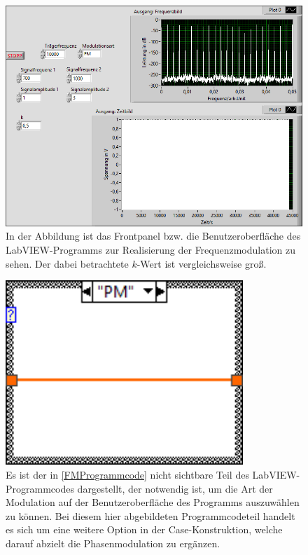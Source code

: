 \documentclass[
a4paper,
12pt,
pagesize,
ngerman
]{scrartcl}
\begin{document}
	\noindent 
	
	\begin{figure}[H]
		\centering
		\includegraphics[width=1.0\textwidth]{EIRE2018Dateien/Tag4/FMPM-Erzeugung/anderekbei10000Traegerfr/FM-FMPM-Erzeugungp}
		\caption{In der Abbildung ist das Frontpanel bzw. die Benutzeroberfläche des LabVIEW-Programms zur Realisierung der Frequenzmodulation zu sehen. Der dabei betrachtete $k$-Wert ist vergleichsweise groß.}
		\label{FMAusgabegroßesk}
	\end{figure}
	
	\noindent
	
	\begin{figure}[H]
		\centering
		\includegraphics[width=0.8\textwidth]{EIRE2018Dateien/Tag4/FMPM-Erzeugung/PM-FMPM-Erzeugungd1} %
		\caption{Es ist der in \cref{FMProgrammcode} nicht sichtbare Teil des LabVIEW-Programmcodes dargestellt, der notwendig ist, um die Art der Modulation auf der Benutzeroberfläche des Programms auszuwählen zu können. Bei diesem hier abgebildeten Programmcodeteil handelt es sich um eine weitere Option in der Case-Konstruktion, welche darauf abzielt die Phasenmodulation zu ergänzen.}
		\label{PMProgrammcode}
	\end{figure}
	
\end{document}
